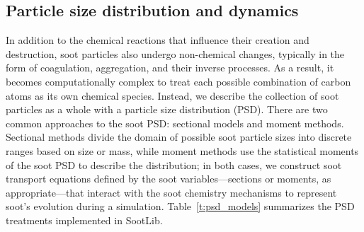 \documentclass[preprint,letterpaper]{elsarticle}
\begin{document}
\subsection{Particle size distribution and dynamics}
\label{s:PSD_dynamics}

In addition to the chemical reactions that influence their creation and destruction, soot particles also undergo non-chemical changes, typically in the form of coagulation, aggregation, and their inverse processes. As a result, it becomes computationally complex to treat each possible combination of carbon atoms as its own chemical species. Instead, we describe the collection of soot particles as a whole with a particle size distribution (PSD). There are two common approaches to the soot PSD: sectional models and moment methods. Sectional methods divide the domain of possible soot particle sizes into discrete ranges based on size or mass, while moment methods use the statistical moments of the soot PSD to describe the distribution; in both cases, we construct soot transport equations defined by the soot variables---sections or moments, as appropriate---that interact with the soot chemistry mechanisms to represent soot's evolution during a simulation. Table~\ref{t:psd_models} summarizes the PSD treatments implemented in SootLib.
%
\begin{table}
    \caption{Summary of soot particle size distribution models implemented in SootLib.}
    \label{t:psd_models}
    \centering
\end{table}
%
\end{document}
